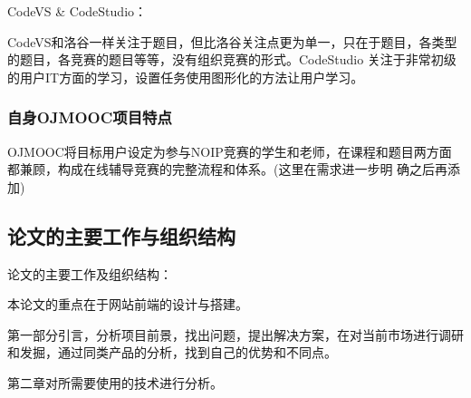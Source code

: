 \documentclass[UTF8,10pt,a4paper]{ctexart}
\begin{document}
     CodeVS \& CodeStudio：

     CodeVS和洛谷一样关注于题目，但比洛谷关注点更为单一，只在于题目，各类型的题目，各竞赛的题目等等，没有组织竞赛的形式。CodeStudio 关注于非常初级的用户IT方面的学习，设置任务使用图形化的方法让用户学习。


     \subsubsection{自身OJMOOC项目特点}
     OJMOOC将目标用户设定为参与NOIP竞赛的学生和老师，在课程和题目两方面都兼顾，构成在线辅导竞赛的完整流程和体系。(这里在需求进一步明 确之后再添加)


  \subsection{论文的主要工作与组织结构}
  论文的主要工作及组织结构：

  本论文的重点在于网站前端的设计与搭建。

  第一部分引言，分析项目前景，找出问题，提出解决方案，在对当前市场进行调研和发掘，通过同类产品的分析，找到自己的优势和不同点。

  第二章对所需要使用的技术进行分析。
\end{document}
